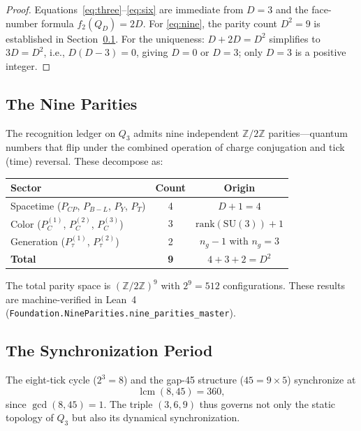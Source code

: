 \documentclass[11pt]{article}
\theoremstyle{plain}
\theoremstyle{definition}
\theoremstyle{remark}
\newcommand{\Z}{\mathbb{Z}}
\newcommand{\lcmop}{\operatorname{lcm}}
\begin{document}
\begin{proof}
Equations~\eqref{eq:three}--\eqref{eq:six} are immediate from $D = 3$ and the face-number formula $f_2(Q_D) = 2D$.
For \eqref{eq:nine}, the parity count $D^2 = 9$ is established in Section~\ref{sec:parities}.
For the uniqueness: $D + 2D = D^2$ simplifies to $3D = D^2$, i.e., $D(D-3) = 0$, giving $D = 0$ or $D = 3$; only $D = 3$ is a positive integer.
\end{proof}

\subsection{The Nine Parities}\label{sec:parities}

The recognition ledger on $Q_3$ admits nine independent $\Z/2\Z$ parities---quantum numbers that flip under the combined operation of charge conjugation and tick (time) reversal.
These decompose as:
\begin{center}
\begin{tabular}{lcc}
\toprule
\textbf{Sector} & \textbf{Count} & \textbf{Origin} \\
\midrule
Spacetime ($P_{CP}$, $P_{B-L}$, $P_Y$, $P_T$) & 4 & $D + 1 = 4$ \\
Color ($P_C^{(1)}$, $P_C^{(2)}$, $P_C^{(3)}$) & 3 & $\mathrm{rank}(\mathrm{SU}(3)) + 1$ \\
Generation ($P_\tau^{(1)}$, $P_\tau^{(2)}$) & 2 & $n_g - 1$ with $n_g = 3$ \\
\midrule
\textbf{Total} & \textbf{9} & $4 + 3 + 2 = D^2$ \\
\bottomrule
\end{tabular}
\end{center}

The total parity space is $(\Z/2\Z)^9$ with $2^9 = 512$ configurations.
These results are machine-verified in Lean~4 (\texttt{Foundation.NineParities.nine\_parities\_master}).

\subsection{The Synchronization Period}

The eight-tick cycle ($2^3 = 8$) and the gap-45 structure ($45 = 9 \times 5$) synchronize at
\[
\lcmop(8, 45) = 360,
\]
since $\gcd(8, 45) = 1$.
The triple $(3, 6, 9)$ thus governs not only the static topology of $Q_3$ but also its dynamical synchronization.

\end{document}
